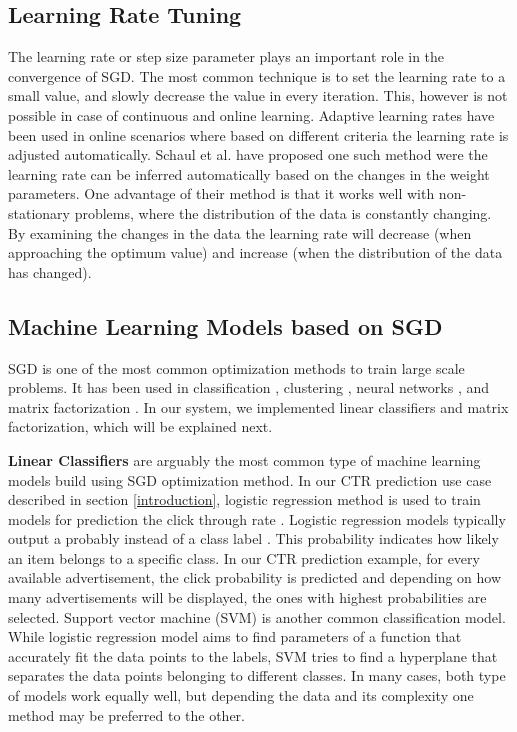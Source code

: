 \documentclass{vldb}
\begin{document}
\subsection{Learning Rate Tuning} \label{learning-rate}
The learning rate or step size parameter plays an important role in the convergence of SGD.
The most common technique is to set the learning rate to a small value, and slowly decrease the value in every iteration. 
This, however is not possible in case of continuous and online learning. 
Adaptive learning rates have been used in online scenarios where based on different criteria the learning rate is adjusted automatically.
Schaul et al. \cite{schaul2013no} have proposed one such method were the learning rate can be inferred automatically based on the changes in the weight parameters. 
One advantage of their method is that it works well with non-stationary problems, where the distribution of the data is constantly changing. 
By examining the changes in the data the learning rate will decrease (when approaching the optimum value) and increase (when the distribution of the data has changed).

\subsection{Machine Learning Models based on SGD}
SGD is one of the most common optimization methods to train large scale problems. 
It has been used in classification \cite{zhang2004solving}, clustering \cite{bottou1995convergence}, neural networks \cite{dean2012large}, and matrix factorization \cite{funk2006netflix}.
In our system, we implemented linear classifiers and matrix factorization, which will be explained next. 

\textbf{Linear Classifiers} are arguably the most common type of machine learning models build using SGD optimization method. 
In our CTR prediction use case described in section \ref{introduction}, logistic regression method is used to train models for prediction the click through rate \cite{macmahan2013}. 
Logistic regression models typically output a probably instead of a class label \cite{hosmer2013applied}. 
This probability indicates how likely an item belongs to a specific class.
In our CTR prediction example, for every available advertisement, the click probability is predicted and depending on how many advertisements will be displayed, the ones with highest probabilities are selected.
Support vector machine (SVM) \cite{steinwart2008support} is another common classification model.
While logistic regression model aims to find parameters of a function that accurately fit the data points to the labels, SVM tries to find a hyperplane that separates the data points belonging to different classes.
In many cases, both type of models work equally well, but depending the data and its complexity one method may be preferred to the other.
\end{document}
